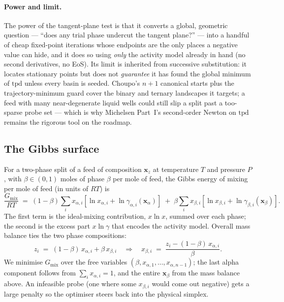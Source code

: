 \documentclass[11pt,a4paper]{article}
\newcommand{\xv}{\mathbf{x}}
\begin{document}
\paragraph{Power and limit.}  The power of the tangent-plane test is
that it converts a global, geometric question --- ``does any trial
phase undercut the tangent plane?'' --- into a handful of cheap
fixed-point iterations whose endpoints are the only places a negative
value can hide, and it does so using \emph{only} the activity model
already in hand (no second derivatives, no EoS).  Its limit is
inherited from successive substitution: it locates stationary points
but does not \emph{guarantee} it has found the global minimum of
$\mathrm{tpd}$ unless every basin is seeded.  Choupo's $n+1$ canonical
starts plus the trajectory-minimum guard cover the binary and ternary
landscapes it targets; a feed with many near-degenerate liquid wells
could still slip a split past a too-sparse probe set --- which is why
Michelsen Part~I's second-order Newton on $\mathrm{tpd}$ remains the
rigorous tool on the roadmap.

\subsection*{The Gibbs surface}

For a two-phase split of a feed of composition $\xv_z$ at temperature
$T$ and pressure $P$, with $\beta \in (0, 1)$ moles of phase $\beta$
per mole of feed, the Gibbs energy of mixing per mole of feed (in
units of $RT$) is
\[
    \frac{G_{\mathrm{mix}}}{RT}
    \;=\;
    (1 - \beta) \sum_i x_{\alpha, i}
    \left[ \ln x_{\alpha, i} + \ln \gamma_{\alpha, i}(\xv_\alpha) \right]
    \;+\;
    \beta \sum_i x_{\beta, i}
    \left[ \ln x_{\beta, i} + \ln \gamma_{\beta, i}(\xv_\beta) \right].
\]
The first term is the ideal-mixing contribution, $x \ln x$, summed
over each phase; the second is the excess part $x \ln \gamma$ that
encodes the activity model.  Overall mass balance ties the two phase
compositions:
\[
    z_i \;=\; (1 - \beta)\,x_{\alpha, i} + \beta\,x_{\beta, i}
    \quad \Longrightarrow \quad
    x_{\beta, i} \;=\; \frac{z_i - (1 - \beta)\,x_{\alpha, i}}{\beta}.
\]
We minimise $G_{\mathrm{mix}}$ over the free variables
$(\beta, x_{\alpha, 1}, \ldots, x_{\alpha, n-1})$; the last alpha
component follows from $\sum_i x_{\alpha, i} = 1$, and the entire
$\xv_\beta$ from the mass balance above.  An infeasible probe (one
where some $x_{\beta, i}$ would come out negative) gets a large
penalty so the optimiser steers back into the physical simplex.
\end{document}
